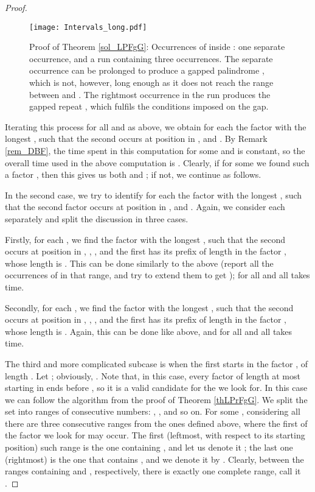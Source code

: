 \documentclass[final]{dmtcs-episciences}
\begin{document}
\begin{proof}
\begin{figure}\begin{center}
\texttt{[image: Intervals\_long.pdf]}
\end{center}
\vspace{-0.5cm}
\caption{Proof of Theorem \ref{sol_LPFgG}: Occurrences of  inside : one separate occurrence, and a run containing three occurrences. The separate occurrence can be prolonged to produce a gapped palindrome , which is not, however, long enough as it does not reach the range between  and . The rightmost occurrence in the run produces the gapped repeat , which fulfils the conditions imposed on the gap.}
\end{figure}


Iterating this process for all  and  as above, we obtain for each  the factor  with the longest , such that the second  occurs at position  in ,  and .
By Remark \ref{rem_DBF}, the time spent in this computation for some  and  is constant, so the overall time used in the above computation is . Clearly, if for some  we found such a factor , then this gives us both  and ; if not, we continue as follows.

In the second case, we try to identify  for each  the factor  with the longest , such that the second  factor occurs at position  in ,  and . Again, we consider each  separately and split the discussion in three cases.

Firstly, for each , we find the factor  with the longest , such that the second  occurs at position  in , , , and the first  has its prefix of length  in the factor , whose length is . This can be done similarly to the above (report all the occurrences of  in that range, and try to extend them to get ); for all  and all  takes  time. 

Secondly, for each , we find the factor  with the longest , such that the second  occurs at position  in , , , and the first  has its prefix of length  in the factor , whose length is . Again, this can be done like above, and for all  and all  takes  time. 

The third and more complicated subcase is when the first  starts in the factor , of length . Let ; obviously, . Note that, in this case, every factor of length at most  starting in  ends before , so it is a valid candidate for the  we look for.
In this case we can follow the algorithm from the proof of Theorem \ref{thLPrFgG}. We split the set  into ranges of consecutive numbers: , , and so on. For some , considering all  there are three consecutive ranges from the ones defined above, where the first  of the factor  we look for may occur. The first (leftmost, with respect to its starting position) such range is the one containing , and let us denote it ; the last one (rightmost) is the one that contains , and we denote it by . Clearly, between the ranges containing  and , respectively, there is exactly one complete range, call it . 


\end{proof}
\end{document}

